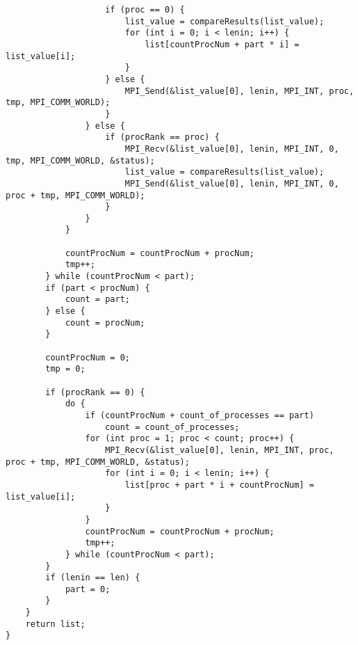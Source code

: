 \documentclass{report}
\begin{document}
\begin{lstlisting}
                    if (proc == 0) {
                        list_value = compareResults(list_value);
                        for (int i = 0; i < lenin; i++) {
                            list[countProcNum + part * i] = list_value[i];
                        }
                    } else {
                        MPI_Send(&list_value[0], lenin, MPI_INT, proc, tmp, MPI_COMM_WORLD);
                    }
                } else {
                    if (procRank == proc) {
                        MPI_Recv(&list_value[0], lenin, MPI_INT, 0, tmp, MPI_COMM_WORLD, &status);
                        list_value = compareResults(list_value);
                        MPI_Send(&list_value[0], lenin, MPI_INT, 0, proc + tmp, MPI_COMM_WORLD);
                    }
                }
            }

            countProcNum = countProcNum + procNum;
            tmp++;
        } while (countProcNum < part);
        if (part < procNum) {
            count = part;
        } else {
            count = procNum;
        }

        countProcNum = 0;
        tmp = 0;

        if (procRank == 0) {
            do {
                if (countProcNum + count_of_processes == part)
                    count = count_of_processes;
                for (int proc = 1; proc < count; proc++) {
                    MPI_Recv(&list_value[0], lenin, MPI_INT, proc, proc + tmp, MPI_COMM_WORLD, &status);
                    for (int i = 0; i < lenin; i++) {
                        list[proc + part * i + countProcNum] = list_value[i];
                    }
                }
                countProcNum = countProcNum + procNum;
                tmp++;
            } while (countProcNum < part);
        }
        if (lenin == len) {
            part = 0;
        }
    }
    return list;
}

\end{lstlisting}
\end{document}
